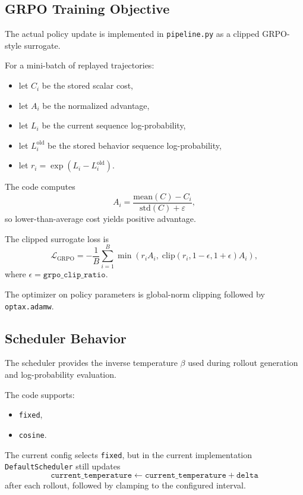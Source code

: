 \documentclass[11pt]{article}
\begin{document}
\subsection{GRPO Training Objective}

The actual policy update is implemented in \texttt{pipeline.py} as a clipped GRPO-style surrogate.

For a mini-batch of replayed trajectories:

\begin{itemize}[leftmargin=*]
\item let $C_i$ be the stored scalar cost,
\item let $A_i$ be the normalized advantage,
\item let $L_i$ be the current sequence log-probability,
\item let $L_i^{\mathrm{old}}$ be the stored behavior sequence log-probability,
\item let $r_i = \exp(L_i - L_i^{\mathrm{old}})$.
\end{itemize}

The code computes
\[
A_i =
\frac{\mathrm{mean}(C) - C_i}{\mathrm{std}(C) + \varepsilon},
\]
so lower-than-average cost yields positive advantage.

The clipped surrogate loss is
\[
\mathcal{L}_{\mathrm{GRPO}}
=
- \frac{1}{B}
  \sum_{i=1}^{B}
  \min\left(
    r_i A_i,\;
    \mathrm{clip}(r_i, 1-\epsilon, 1+\epsilon) A_i
  \right),
\]
where $\epsilon = \texttt{grpo\_clip\_ratio}$.

The optimizer on policy parameters is global-norm clipping followed by \texttt{optax.adamw}.

\subsection{Scheduler Behavior}

The scheduler provides the inverse temperature $\beta$ used during rollout generation and log-probability evaluation.

The code supports:

\begin{itemize}[leftmargin=*]
\item \texttt{fixed},
\item \texttt{cosine}.
\end{itemize}

The current config selects \texttt{fixed}, but in the current implementation \texttt{DefaultScheduler} still updates
\[
\texttt{current\_temperature} \leftarrow \texttt{current\_temperature} + \texttt{delta}
\]
after each rollout, followed by clamping to the configured interval.
\end{document}
